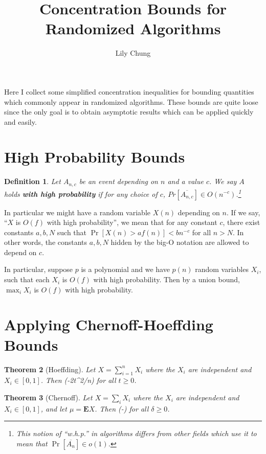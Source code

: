 \documentclass[11pt,a4paper]{article}
\title{Concentration Bounds for Randomized Algorithms}
\author{Lily Chung}
\date{}
\newtheorem{theorem}{Theorem}
\newtheorem{definition}[theorem]{Definition}
\newcommand*{\defn}[1]{\textbf{#1}}
\newcommand*{\E}[0]{\mathbf{E}}
\def\[#1\]{\begin{align*}#1\end{align*}}
\begin{document}
\maketitle

Here I collect some simplified concentration inequalities for bounding quantities which commonly appear in randomized algorithms.
These bounds are quite loose since the only goal is to obtain asymptotic results which can be applied quickly and easily.

\section{High Probability Bounds}

\begin{definition}
  Let \(A_{n, c}\) be an event depending on \(n\) and a value \(c\).
  We say \(A\) holds \defn{with high probability} if
  for any choice of \(c\),
  \(Pr[\overline{A_{n, c}}] \in O(n^{-c})\).\footnote{This notion of ``w.h.p.'' in algorithms differs from other fields which use it to mean that $\Pr[\overline{A_n}] \in o(1)$.}
\end{definition}

In particular we might have a random variable \(X(n)\) depending on \(n\).
If we say, ``\(X\) is \(O(f)\) with high probability'',
we mean that for any constant \(c\), there exist constants \(a, b, N\) such that
\(\Pr[X(n) > af(n)] < bn^{-c}\) for all \(n > N\).
In other words, the constants \(a, b, N\) hidden by the big-O notation are allowed to depend on \(c\).

In particular, suppose \(p\) is a polynomial and we have \(p(n)\) random variables \(X_i\),
such that each \(X_i\) is \(O(f)\) with high probability.
Then by a union bound, \(\max_i X_i\) is \(O(f)\) with high probability.

\section{Applying Chernoff-Hoeffding Bounds}

\begin{theorem}[Hoeffding]
  \label{thm:hoeffding}
  Let $X = \sum_{i=1}^n X_i$ where the $X_i$ are independent and $X_i \in [0, 1]$.
  Then \[\Pr[X - \E X \ge t] \le \exp(-2t^2/n)\]
  for all $t \ge 0$.
\end{theorem}

\begin{theorem}[Chernoff]
  \label{thm:chernoff}
  Let \(X = \sum_i X_i\) where the \(X_i\) are independent and $X_i \in [0, 1]$, and let \(\mu = \E X\).
  Then \[\Pr[X \ge (1 + \delta)\mu] \le \exp\left(-\mu\right)\]
  for all \(\delta \ge 0\).
\end{theorem}
\end{document}
